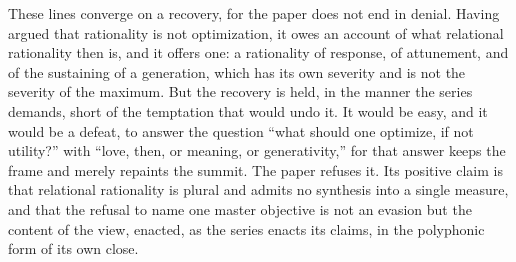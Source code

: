 These lines converge on a recovery, for the paper does not end in denial. Having argued that rationality is not optimization, it owes an account of what relational rationality then is, and it offers one: a rationality of response, of attunement, and of the sustaining of a generation, which has its own severity and is not the severity of the maximum. But the recovery is held, in the manner the series demands, short of the temptation that would undo it. It would be easy, and it would be a defeat, to answer the question ``what should one optimize, if not utility?'' with ``love, then, or meaning, or generativity,'' for that answer keeps the frame and merely repaints the summit. The paper refuses it. Its positive claim is that relational rationality is plural and admits no synthesis into a single measure, and that the refusal to name one master objective is not an evasion but the content of the view, enacted, as the series enacts its claims, in the polyphonic form of its own close.
